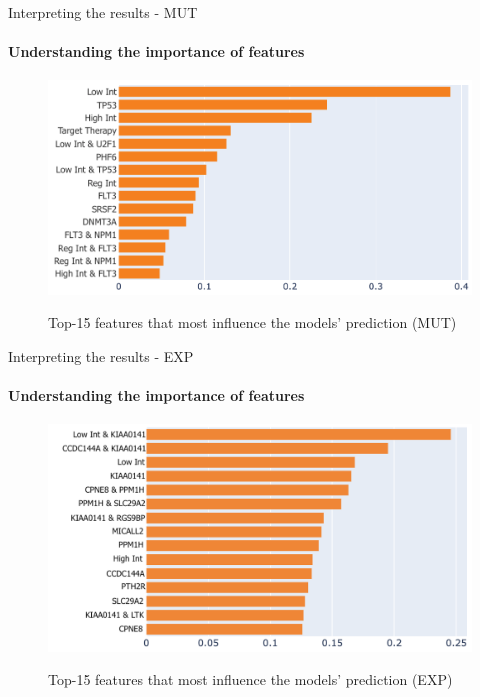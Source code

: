 \begin{frame}{Interpreting the results - MUT}
\framesubtitle{Understanding the importance of features}
    
\begin{figure}[!htbp]
    \centering
         \includegraphics[width=.65\textwidth]{beamerthemesrc/figs/feat_importance_MUT.png}
         \label{fig:feat_imp_MUT}
    \caption{Top-15 features that most influence the models' prediction (MUT)}
    \label{fig:feature-importance}
    \end{figure}

\end{frame}



\begin{frame}{Interpreting the results - EXP}
\framesubtitle{Understanding the importance of features}
    
\begin{figure}[!htbp]
    \centering
         \includegraphics[width=.65\textwidth]{beamerthemesrc/figs/feat_importance_EXP.png}
         \label{fig:feat_imp_EXP}
    \caption{Top-15 features that most influence the models' prediction (EXP)}
    \label{fig:feature-importance}
    \end{figure}

\end{frame}








  
